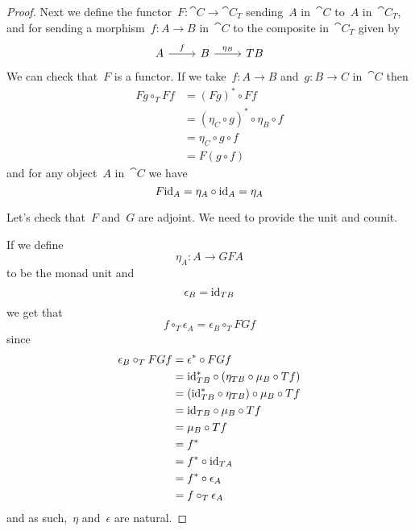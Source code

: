 \documentclass[../TFG.tex]{subfiles}
\begin{document}
\begin{proof}
    Next we define the functor~\(F:\cat{C}\longrightarrow\cat{C}_{T}\)
    sending~\(A\) in~\(\cat{C}\) to~\(A\) in~\(\cat{C}_{T}\), and for sending a
    morphism~\(f:A\longrightarrow B\) in~\(\cat{C}\) to the composite
    in~\(\cat{C}_{T}\) given by
    \[\begin{tikzcd}
        A \ar[r, "f"] & B \ar[r, "\eta_{B}"] & TB
    \end{tikzcd}\]
    We can check that~\(F\) is a functor. If we take~\(f:A\longrightarrow B\)
    and~\(g:B\longrightarrow C\) in~\(\cat{C}\) then
    \begin{align*}
        Fg \circ_{T} Ff
            &= (Fg)^{\ast} \circ Ff \\
            &= (\eta_{C} \circ g)^{\ast} \circ \eta_{B} \circ f \\
            &= \eta_{C} \circ g \circ f \\
            &= F(g \circ f)
    \end{align*}
    and for any object~\(A\) in~\(\cat{C}\) we have
    \[
        F\mathrm{id}_{A} = \eta_{A} \circ \mathrm{id}_{A} = \eta_{A}
    \]

    Let's check that~\(F\) and~\(G\) are adjoint. We need to provide the unit
    and counit.

    If we define
    \[
        \eta_{A} : A \longrightarrow GF A
    \]
    to be the monad unit and
    \[
        \epsilon_{B} = \mathrm{id}_{TB}
    \]
    we get that
    \[
        f \circ_{T} \epsilon_{A} = \epsilon_{B} \circ_{T} FGf
    \]
    since
    \begin{align*}
        \epsilon_B \circ_T FGf 
            &= \epsilon^{\ast} \circ FGf \\
            &= \mathrm{id}_{TB}^{\ast} \circ (\eta_{TB} \circ \mu_{B} \circ Tf) \\
            &= (\mathrm{id}_{TB}^{\ast} \circ \eta_{TB}) \circ \mu_{B} \circ Tf \\
            &= \mathrm{id}_{TB} \circ \mu_{B} \circ Tf \\
            &= \mu_{B} \circ Tf \\
            &= f^{\ast} \\
            &= f^{\ast} \circ \mathrm{id}_{TA} \\
            &= f^{\ast} \circ \epsilon_{A} \\
            &= f \circ_{T} \epsilon_{A}
    \end{align*}
    and as such,~\(\eta\) and~\(\epsilon\) are natural.


\end{proof}
\end{document}
